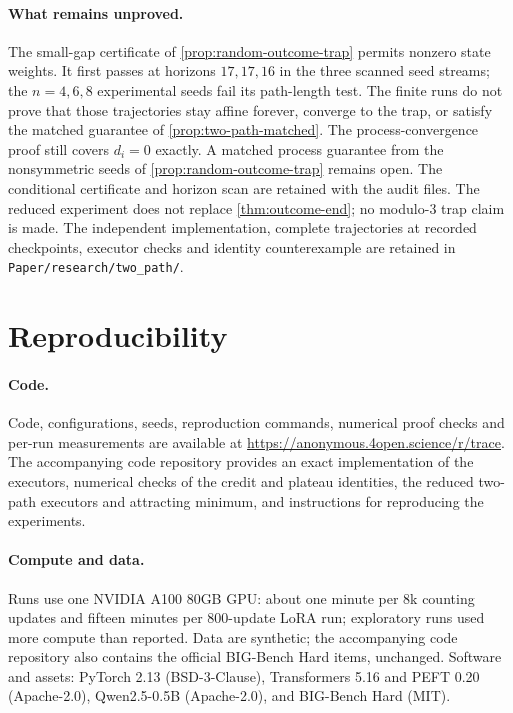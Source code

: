 \paragraph{What remains unproved.}
The small-gap certificate of \cref{prop:random-outcome-trap} permits nonzero
state weights. It first passes at horizons $17,17,16$ in the three scanned seed
streams; the $n=4,6,8$ experimental seeds fail its path-length test.
The finite runs do not prove that those trajectories stay affine forever,
converge to the trap, or satisfy the matched guarantee of \cref{prop:two-path-matched}.
The process-convergence proof still covers $d_i=0$ exactly. A matched process
guarantee from the nonsymmetric seeds of \cref{prop:random-outcome-trap} remains
open. The conditional certificate and horizon scan are retained with the audit files.
The reduced experiment does not replace
\cref{thm:outcome-end}; no modulo-$3$ trap claim is made.
The independent implementation, complete trajectories at recorded checkpoints,
executor checks and identity counterexample are retained in
\nolinkurl{Paper/research/two_path/}.

\section{Reproducibility}
\label{app:reproducibility}

\paragraph{Code.} Code, configurations, seeds, reproduction commands, numerical proof checks and per-run measurements are available at
\url{https://anonymous.4open.science/r/trace}. The accompanying code repository provides an exact implementation of the executors,
numerical checks of the credit and plateau identities, the reduced two-path executors and attracting minimum, and instructions for reproducing the experiments.

\paragraph{Compute and data.} Runs use one NVIDIA A100 80GB GPU: about one minute per $8$k counting updates and fifteen minutes per
$800$-update LoRA run; exploratory runs used more compute than reported. Data are synthetic; the accompanying code repository also
contains the official BIG-Bench Hard items, unchanged. Software and assets: PyTorch 2.13 (BSD-3-Clause), Transformers 5.16 and PEFT 0.20 (Apache-2.0), Qwen2.5-0.5B \citep{qwen2025qwen25} (Apache-2.0), and BIG-Bench Hard \citep{suzgun2022challenging} (MIT).

